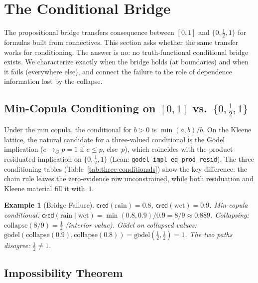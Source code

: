 \documentclass[11pt,a4paper]{article}
\newtheorem{example}[theorem]{Example}
\newcommand{\cred}{\mathsf{cred}}
\begin{document}
\section{The Conditional Bridge}
\label{sec:cond-bridge}

The propositional bridge transfers consequence between $[0,1]$ and
$\{0, \tfrac{1}{2}, 1\}$ for formulas built from connectives.
This section asks whether the same transfer works for conditioning.
The answer is no: no truth-functional conditional bridge exists.
We characterize exactly when the bridge holds (at boundaries) and
when it fails (everywhere else), and connect the failure to the
role of dependence information lost by the collapse.

\subsection{Min-Copula Conditioning on $[0,1]$ vs.\
$\{0, \tfrac{1}{2}, 1\}$}
\label{sec:min-copula-cond}

Under the min copula, the conditional for $b > 0$ is
$\min(a,b)/b$.
On the Kleene lattice, the natural candidate for a three-valued
conditional is the G\"odel implication
($e \to_G p = 1$ if $e \leq p$, else~$p$),
which coincides with the
product-residuated implication on $\{0, \tfrac{1}{2}, 1\}$
(Lean: \texttt{godel\_impl\_eq\_prod\_resid}).
The three conditioning tables (Table~\ref{tab:three-conditionals})
show the key difference: the chain rule leaves the zero-evidence row
unconstrained, while both residuation and Kleene material fill it
with~$1$.

\begin{example}[Bridge Failure]
\label{ex:bridge-failure}
$\cred(\text{rain}) = 0.8$, $\cred(\text{wet}) = 0.9$.
Min-copula conditional:
$\cred(\text{rain} \mid \text{wet})
= \min(0.8, 0.9)/0.9 = 8/9 \approx 0.889$.
Collapsing: $\mathrm{collapse}(8/9) = \tfrac{1}{2}$ (interior value).
G\"odel on collapsed values:
$\mathrm{g\ddot{o}del}(\mathrm{collapse}(0.9),
\mathrm{collapse}(0.8))
= \mathrm{g\ddot{o}del}(\tfrac{1}{2}, \tfrac{1}{2}) = 1$.
The two paths disagree: $\tfrac{1}{2} \neq 1$.
\end{example}

\subsection{Impossibility Theorem}
\label{sec:impossibility-thm}
\end{document}
